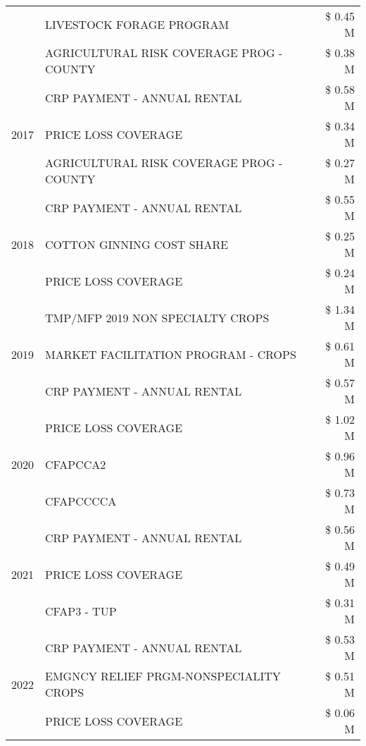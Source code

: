 \begin{tabular}{llr}
 & LIVESTOCK FORAGE PROGRAM & \$ 0.45 M \\
 & AGRICULTURAL RISK COVERAGE PROG - COUNTY & \$ 0.38 M \\
\cline{1-3}
\multirow[t]{3}{*}{2017} & CRP PAYMENT - ANNUAL RENTAL & \$ 0.58 M \\
 & PRICE LOSS COVERAGE & \$ 0.34 M \\
 & AGRICULTURAL RISK COVERAGE PROG - COUNTY & \$ 0.27 M \\
\cline{1-3}
\multirow[t]{3}{*}{2018} & CRP PAYMENT - ANNUAL RENTAL & \$ 0.55 M \\
 & COTTON GINNING COST SHARE & \$ 0.25 M \\
 & PRICE LOSS COVERAGE & \$ 0.24 M \\
\cline{1-3}
\multirow[t]{3}{*}{2019} & TMP/MFP 2019 NON SPECIALTY CROPS & \$ 1.34 M \\
 & MARKET FACILITATION PROGRAM - CROPS & \$ 0.61 M \\
 & CRP PAYMENT - ANNUAL RENTAL & \$ 0.57 M \\
\cline{1-3}
\multirow[t]{3}{*}{2020} & PRICE LOSS COVERAGE & \$ 1.02 M \\
 & CFAPCCA2 & \$ 0.96 M \\
 & CFAPCCCCA & \$ 0.73 M \\
\cline{1-3}
\multirow[t]{3}{*}{2021} & CRP PAYMENT - ANNUAL RENTAL & \$ 0.56 M \\
 & PRICE LOSS COVERAGE & \$ 0.49 M \\
 & CFAP3 - TUP & \$ 0.31 M \\
\cline{1-3}
\multirow[t]{3}{*}{2022} & CRP PAYMENT - ANNUAL RENTAL & \$ 0.53 M \\
 & EMGNCY RELIEF PRGM-NONSPECIALITY CROPS & \$ 0.51 M \\
 & PRICE LOSS COVERAGE & \$ 0.06 M \\
\cline{1-3}
\bottomrule
\end{tabular}
